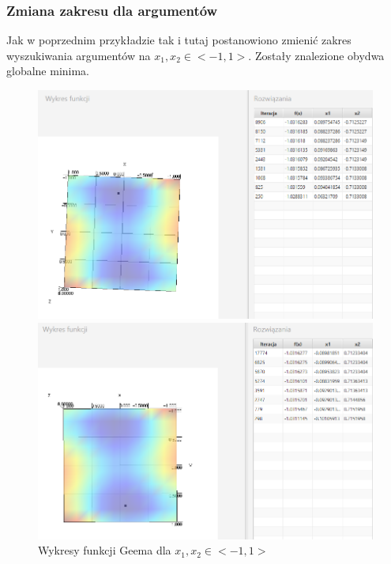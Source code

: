 \documentclass[10pt, a4paper]{article}
\begin{document}
\subsubsection{Zmiana zakresu dla argumentów}
\label{subsubsec:gemm2}
Jak w poprzednim przykładzie tak i tutaj postanowiono zmienić zakres wyszukiwania argumentów na $x_{1}, x_{2} \in <-1,1>$. Zostały znalezione obydwa globalne minima.
\begin{figure}[htbp] 
	\begin{minipage}[b]{1\textwidth}
		\centering
		\includegraphics[width=\linewidth]{images/Geeme.PNG} 
	\end{minipage} 
	 \newline\newline
	\begin{minipage}[b]{1\textwidth}
		\centering
		\includegraphics[width=\linewidth]{images/Geem2e.PNG} 
	\end{minipage}
	\label{fig:22}
	\caption{Wykresy funkcji Geema dla $x_{1}, x_{2} \in <-1,1>$}
\end{figure}
\end{document}
